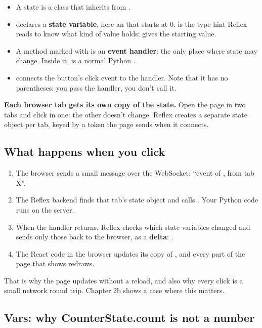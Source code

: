 \begin{itemize}
\item A state is a class that inherits from .
\item {} declares a \textbf{state variable}, here an  that starts at 0.  is the type hint Reflex reads to know what kind of value  holds;  gives the starting value.
\item A method marked with  is an \textbf{event handler}: the only place where state may change. Inside it,  is a normal Python .
\item {} connects the button's click event to the handler. Note that it has no parentheses: you pass the handler, you don't call it.
\end{itemize}

\textbf{Each browser tab gets its own copy of the state.} Open the page in two tabs and click in one: the other doesn't change. Reflex creates a separate state object per tab, keyed by a token the page sends when it connects.

\subsection{What happens when you click}

\begin{enumerate}
\item The browser sends a small message over the WebSocket: ``event  of , from tab X''.
\item The Reflex backend finds that tab's state object and calls . Your Python code runs on the server.
\item When the handler returns, Reflex checks which state variables changed and sends only those back to the browser, as a \textbf{delta}: .
\item The React code in the browser updates its copy of , and every part of the page that shows  redraws.
\end{enumerate}

That is why the page updates without a reload, and also why every click is a small network round trip. Chapter 2b shows a case where this matters.

\subsection{Vars: why CounterState.count is not a number}


